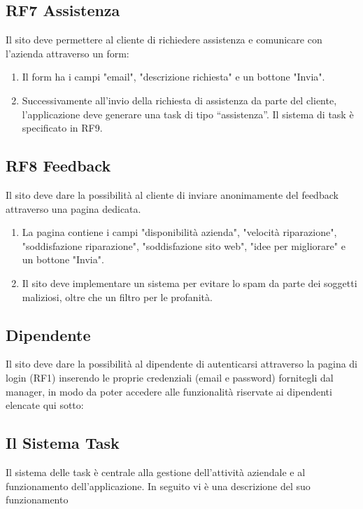\documentclass{report}
\begin{document}
\subsection*{RF7 Assistenza}
Il sito deve permettere al cliente di richiedere assistenza e comunicare con l'azienda attraverso un form:

\begin{enumerate}
	\item Il form ha i campi "email", "descrizione richiesta" e un bottone "Invia".
	
	\item Successivamente all’invio della richiesta di assistenza da parte del cliente, l’applicazione deve generare una task di tipo “assistenza”. Il sistema di task è specificato in RF9.
	
	
\end{enumerate}

\subsection*{RF8 Feedback}
Il sito deve dare la possibilità al cliente di inviare anonimamente del feedback attraverso una pagina dedicata.
\begin{enumerate}
	\item La pagina contiene i campi "disponibilità azienda", "velocità riparazione", "soddisfazione riparazione", "soddisfazione sito web", "idee per migliorare" e un bottone "Invia".
	
	\item Il sito deve implementare un sistema per evitare lo spam da parte dei soggetti maliziosi, oltre che un filtro  per le profanità.
	
\end{enumerate}

\subsection{Dipendente}
Il sito deve dare la possibilità al dipendente di autenticarsi attraverso la pagina di login (RF1) inserendo le proprie credenziali (email e password) fornitegli dal manager, in modo da poter accedere alle funzionalità riservate ai dipendenti elencate qui sotto:

\subsection*{Il Sistema Task}
Il sistema delle task è centrale alla gestione dell'attività aziendale e al funzionamento dell'applicazione. In seguito vi è una descrizione del suo funzionamento
\end{document}
